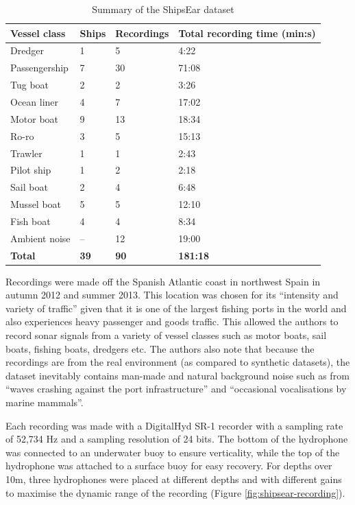 \begin{table}[htbp]
\centering
\begin{tabular}{llll}
\toprule
\textbf{Vessel class} & \textbf{Ships} & \textbf{Recordings} & \textbf{Total recording time (min:s)} \\ \midrule
Dredger       & 1  & 5   & 4:22  \\
Passengership & 7  & 30  & 71:08 \\
Tug boat      & 2  & 2   & 3:26  \\
Ocean liner   & 4  & 7   & 17:02 \\
Motor boat    & 9  & 13  & 18:34 \\
Ro-ro         & 3  & 5   & 15:13 \\
Trawler       & 1  & 1   & 2:43  \\
Pilot ship    & 1  & 2   & 2:18  \\
Sail boat     & 2  & 4   & 6:48  \\
Mussel boat   & 5  & 5   & 12:10 \\
Fish boat     & 4  & 4   & 8:34  \\
Ambient noise & –  & 12  & 19:00 \\ 
\textbf{Total}& \textbf{39} & \textbf{90} & \textbf{181:18} \\ \bottomrule
\end{tabular}
\caption{Summary of the ShipsEar dataset}
\label{tab:shipsear-summary}
\end{table}

Recordings were made off the Spanish Atlantic coast in northwest Spain in autumn 2012 and summer 2013. This location was chosen for its ``intensity and variety of traffic'' given that it is one of the largest fishing ports in the world and also experiences heavy passenger and goods traffic. This allowed the authors to record sonar signals from a variety of vessel classes such as motor boats, sail boats, fishing boats, dredgers etc. The authors also note that because the recordings are from the real environment (as compared to synthetic datasets), the dataset inevitably contains man-made and natural background noise such as from ``waves crashing against the port infrastructure'' and ``occasional vocalisations by marine mammals''.

Each recording was made with a DigitalHyd SR-1 recorder with a sampling rate of 52,734 Hz and a sampling resolution of 24 bits. The bottom of the hydrophone was connected to an underwater buoy to ensure verticality, while the top of the hydrophone was attached to a surface buoy for easy recovery. For depths over 10m, three hydrophones were placed at different depths and with different gains to maximise the dynamic range of the recording (Figure \ref{fig:shipsear-recording}). 

